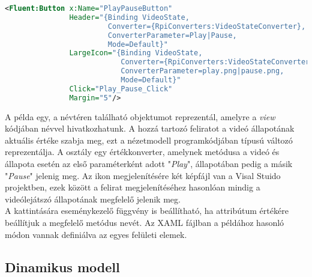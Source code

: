 \begin{mdframed}[backgroundcolor=gray!20]
\begin{small}
\begin{scriptsize}
\begin{lstlisting}[language=XML]
<Fluent:Button x:Name="PlayPauseButton" 
			   Header="{Binding VideoState, 
			            Converter={RpiConverters:VideoStateConverter}, 
			            ConverterParameter=Play|Pause, 
			            Mode=Default}" 
               LargeIcon="{Binding VideoState,
               			   Converter={RpiConverters:VideoStateConverter}, 
               			   ConverterParameter=play.png|pause.png,
               			   Mode=Default}" 
               Click="Play_Pause_Click" 
               Margin="5"/>
\end{lstlisting}
\end{scriptsize}
\end{small}
\end{mdframed}

A példa egy, a  névtéren található  objektumot reprezentál, amelyre a \emph{view} kódjában  névvel hivatkozhatunk. A hozzá tartozó feliratot a videó állapotának aktuális értéke szabja meg, ezt a nézetmodell programkódjában  típusú változó reprezentálja. A  osztály egy értékkonverter, amelynek  metódusa a videó  és  állapota esetén az első  paraméterként adott "\emph{Play}",  állapotában pedig a másik "\emph{Pause}"  jelenig meg. Az ikon megjelenítésére két képfájl van a Visal Stuido projektben, ezek között a felirat megjelenítéséhez hasonlóan mindig a videólejátszó állapotának megfelelő jelenik meg. \\
A  kattintására eseménykezelő függvény is beállítható, ha  attribútum értékére beállítjuk a megfelelő metódus nevét. Az XAML fájlban a példához hasonló módon vannak definiálva az egyes felületi elemek.

\subsection{Dinamikus modell}

